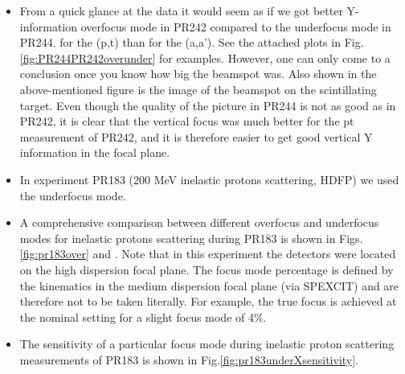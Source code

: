 \documentclass[11pt]{report}
\begin{document}
\begin{itemize}
\item From a quick glance at the data it would seem as if we got better Y-information 
overfocus mode in PR242 compared to the underfocus mode in PR244.
for the (p,t) than for the (a,a'). See the attached plots in 
Fig.\ref{fig:PR244PR242overunder} for examples.
However, one can only come to a conclusion once you know how big the beamspot was.
Also shown in the above-mentioned figure is the image of the beamspot on the 
scintillating target. 
Even though the quality of the picture in PR244 is not as good as in PR242, it is clear
that the vertical focus was much better for the pt measurement of PR242, and it is
therefore easier to get good vertical Y information in the focal plane.

\item In experiment PR183 (200 MeV inelastic protons scattering, HDFP) we used the
underfocus mode.

\item A comprehensive comparison between different overfocus and underfocus modes
for inelastic protons scattering during PR183 is shown in Figs.\ref{fig:pr183over}
and \label{fig:pr183under}.
Note that in this experiment the detectors were located on the high 
dispersion focal plane. The focus mode percentage is defined by the 
kinematics in the medium dispersion focal plane (via SPEXCIT) and are 
therefore not to be taken literally. For example, the true focus is achieved
at the nominal setting for a slight focus mode of 4\%.

\item The sensitivity of a particular focus mode during inelastic proton
scattering measurements of PR183 is shown in Fig.\ref{fig:pr183underXsensitivity}.

\end{itemize}
\end{document}
